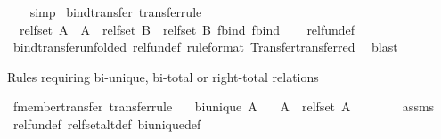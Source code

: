 \begin{isabellebody}
\ \ \isamarkupfalse%
\ simp%
\endisatagproof
{\isafoldproof}%
%
\isadelimproof
\isanewline
%
\endisadelimproof
\isanewline
{}\isamarkupfalse%
\ bind{\isacharunderscore}transfer\ {\isacharbrackleft}transfer{\isacharunderscore}rule{\isacharbrackright}{\isacharcolon}\isanewline
\ \ {\isachardoublequoteopen}{\isacharparenleft}rel{\isacharunderscore}fset\ A\ {\isacharequal}{\isacharequal}{\isacharequal}{\isachargreater}\ {\isacharparenleft}A\ {\isacharequal}{\isacharequal}{\isacharequal}{\isachargreater}\ rel{\isacharunderscore}fset\ B{\isacharparenright}\ {\isacharequal}{\isacharequal}{\isacharequal}{\isachargreater}\ rel{\isacharunderscore}fset\ B{\isacharparenright}\ fbind\ fbind{\isachardoublequoteclose}\isanewline
%
\isadelimproof
\ \ %
\endisadelimproof
%
\isatagproof
{}\isamarkupfalse%
\ rel{\isacharunderscore}fun{\isacharunderscore}def\isanewline
\ \ \isamarkupfalse%
\ bind{\isacharunderscore}transfer{\isacharbrackleft}unfolded\ rel{\isacharunderscore}fun{\isacharunderscore}def{\isacharcomma}\ rule{\isacharunderscore}format{\isacharcomma}\ Transfer{\isachardot}transferred{\isacharbrackright}\ \isamarkupfalse%
\ blast%
\endisatagproof
{\isafoldproof}%
%
\isadelimproof
%
\endisadelimproof
%
\begin{isamarkuptext}%
Rules requiring bi-unique, bi-total or right-total relations%
\end{isamarkuptext}\isamarkuptrue%
\isamarkupfalse%
\ fmember{\isacharunderscore}transfer\ {\isacharbrackleft}transfer{\isacharunderscore}rule{\isacharbrackright}{\isacharcolon}\isanewline
\ \ \ {\isachardoublequoteopen}bi{\isacharunderscore}unique\ A{\isachardoublequoteclose}\isanewline
\ \ \ {\isachardoublequoteopen}{\isacharparenleft}A\ {\isacharequal}{\isacharequal}{\isacharequal}{\isachargreater}\ rel{\isacharunderscore}fset\ A\ {\isacharequal}{\isacharequal}{\isacharequal}{\isachargreater}\ {\isacharparenleft}{\isacharequal}{\isacharparenright}{\isacharparenright}\ {\isacharparenleft}{\isacharbar}{\isasymin}{\isacharbar}{\isacharparenright}\ {\isacharparenleft}{\isacharbar}{\isasymin}{\isacharbar}{\isacharparenright}{\isachardoublequoteclose}\isanewline
%
\isadelimproof
\ \ %
\endisadelimproof
%
\isatagproof
{}\isamarkupfalse%
\ assms\ \isamarkupfalse%
\ rel{\isacharunderscore}fun{\isacharunderscore}def\ rel{\isacharunderscore}fset{\isacharunderscore}alt{\isacharunderscore}def\ bi{\isacharunderscore}unique{\isacharunderscore}def\ \isamarkupfalse%

\end{isabellebody}

